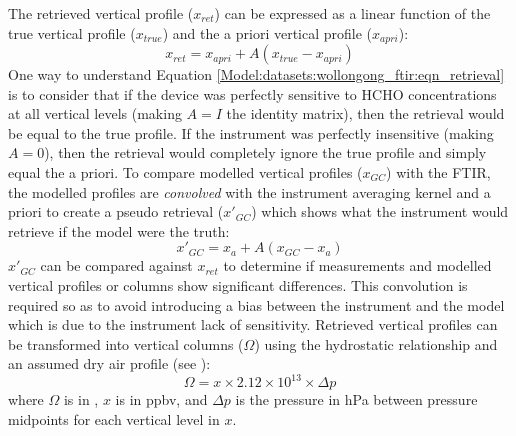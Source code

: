      
      
      
      The retrieved vertical profile ($x_{ret}$) can be expressed as a linear function of the true vertical profile ($x_{true}$) and the a priori vertical profile ($x_{apri}$):
      \begin{equation}
        \label{Model:datasets:wollongong_ftir:eqn_retrieval}
        x_{ret} = x_{apri} + A \left( x_{true} - x_{apri} \right)
      \end{equation}
      One way to understand Equation \ref{Model:datasets:wollongong_ftir:eqn_retrieval} is to consider that if the device was perfectly sensitive to HCHO concentrations at all vertical levels (making $A=I$ the identity matrix), then the retrieval would be equal to the true profile.
      If the instrument was perfectly insensitive (making $A=0$), then the retrieval would completely ignore the true profile and simply equal the a priori.
      To compare modelled vertical profiles ($x_{GC}$) with the FTIR, the modelled profiles are \textit{convolved} with the instrument averaging kernel and a priori to create a pseudo retrieval ($x'_{GC}$) which shows what the instrument would retrieve if the model were the truth:
      \begin{equation}
        x'_{GC} = x_{a} + A \left( x_{GC} - x_{a} \right)
      \end{equation}
      $x'_{GC}$ can be compared against $x_{ret}$ to determine if measurements and modelled vertical profiles or columns show significant differences.
      This convolution is required so as to avoid introducing a bias between the instrument and the model which is due to the instrument lack of sensitivity.
      Retrieved vertical profiles can be transformed into vertical columns ($\Omega$) using the hydrostatic relationship and an assumed dry air profile (see \textcite{Deeter2002}):
      \begin{equation}
        \Omega = x \times 2.12 \times 10^{13} \times \Delta p
      \end{equation}
      where $\Omega$ is in \moleccm, $x$ is in ppbv, and $\Delta p$ is the pressure in hPa between pressure midpoints for each vertical level in $x$.


